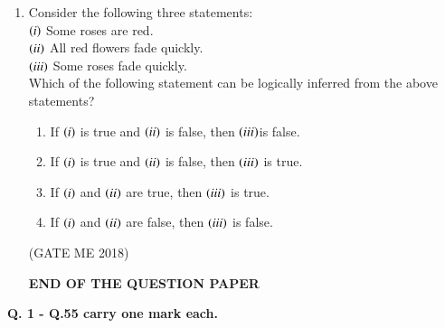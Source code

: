 \documentclass[journal]{IEEEtran}
\numberwithin{equation}{enumi}
\numberwithin{figure}{enumi}
\begin{document}
\begin{enumerate}
\item Consider the following three statements:\\$\left(i\right)$ Some roses are red.\\$\left(ii\right)$ All red flowers fade quickly.\\$\left(iii\right)$ Some roses fade quickly.\\Which of the following statement can be logically inferred from the above statements?
\begin{enumerate}
    \item If $\left(i\right)$ is true and $\left(ii\right)$ is false, then $\left(iii\right)$is false.
    \item If $\left(i\right)$ is true and $\left(ii\right)$ is false, then $\left(iii\right)$ is true.
    \item If $\left(i\right)$ and $\left(ii\right)$ are true, then $\left(iii\right)$ is true.
    \item If $\left(i\right)$ and $\left(ii\right)$ are false, then $\left(iii\right)$ is false.
\end{enumerate}
  \hfill{(GATE ME 2018)}
\begin{center}
\Large
\textbf{END OF THE QUESTION PAPER}
\end{center}
\end{enumerate}
\newpage
\textbf{Q. 1 - Q.55  carry one mark each.}
\end{document}
